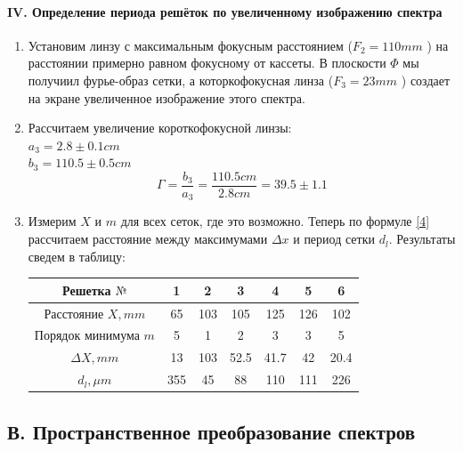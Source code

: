 \documentclass[12pt]{article}
\begin{document}
\paragraph{IV. Определение периода решёток по увеличенному изображению спектра}
\begin{enumerate}
    \item Установим линзу с максимальным фокусным расстоянием ($F_2 = 110 mm$ ) на расстоянии примерно равном фокусному от кассеты. В плоскости $\Phi$ мы получиил фурье-образ сетки, а которкофокусная линза ($F_3 = 23 mm$ ) создает на экране увеличенное изображение этого спектра.
    
    \item Рассчитаем увеличение короткофокусной линзы: \\
    $ a_3 = 2.8 \pm 0.1 cm $ \\ 
    $ b_3 = 110.5 \pm 0.5 cm  $ \\
    \[ \Gamma = \frac{b_3}{a_3} = \frac{110.5 cm}{2.8 cm} = 39.5 \pm 1.1 \]
    
    \item Измерим $X$ и $m$ для всех сеток, где это возможно. Теперь по формуле \ref{4} рассчитаем расстояние между максимумами $\Delta x$ и период сетки $d_l$. Результаты сведем в таблицу: \\
    \begin{tabu} to 1\textwidth{|c|c|c|c|c|c|c|}
    \hline
    Решетка $№$ & 1 & 2 & 3 & 4 & 5 & 6 \\
    \hline
    Расстояние $X, mm$ & 65 & 103 & 105 & 125 & 126 & 102 \\
    \hline
    Порядок минимума $m$ & 5 & 1 & 2 & 3 & 3 & 5 \\
    \hline
    $ \Delta X, mm $ & 13 & 103 & 52.5 & 41.7 & 42 & 20.4 \\
    \hline
    $ d_l, \mu m $ & 355 & 45 & 88 & 110 & 111 & 226 \\
    \hline
    \end{tabu}
    
\end{enumerate}

\subsection*{В. Пространственное преобразование спектров}
\end{document}
